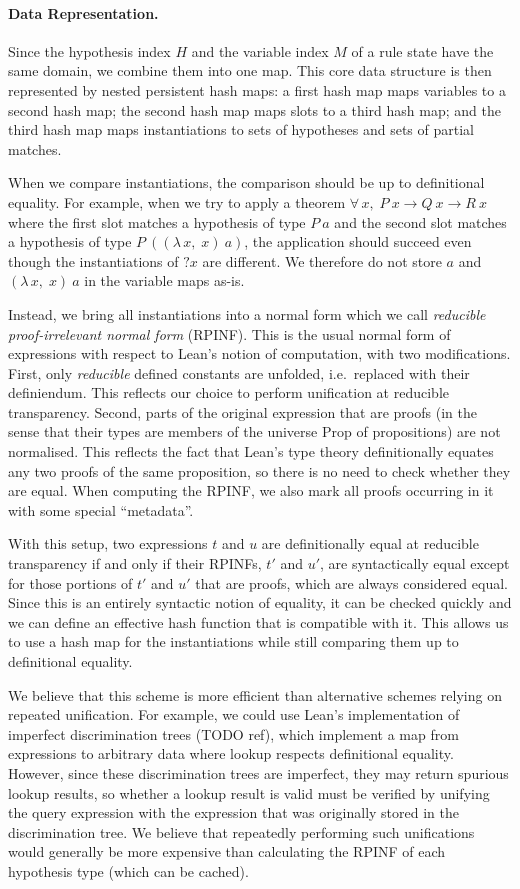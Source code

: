 \documentclass[runningheads]{llncs}
\newcommand{\Lam}[2]{\ensuremath{\lambda\, #1,\; #2}}
\newcommand{\All}[2]{\ensuremath{\forall\, #1,\; #2}}
\newcommand{\mvar}[1]{\ensuremath{?#1}}
\newcommand{\Prop}{\ensuremath{\mathrm{Prop}}}
\begin{document}
\paragraph{Data Representation.}
Since the hypothesis index $H$ and the variable index $M$ of a rule state have the same domain, we combine them into one map.
This core data structure is then represented by nested persistent hash maps: a first hash map maps variables to a second hash map; the second hash map maps slots to a third hash map; and the third hash map maps instantiations to sets of hypotheses and sets of partial matches.

When we compare instantiations, the comparison should be up to definitional equality.
For example, when we try to apply a theorem $\All{x}{P~x → Q~x → R~x}$ where the first slot matches a hypothesis of type $P~a$ and the second slot matches a hypothesis of type $P~((\Lam{x}{x})~a)$, the application should succeed even though the instantiations of $\mvar{x}$ are different.
We therefore do not store $a$ and $(\Lam{x}{x})~a$ in the variable maps as-is.

Instead, we bring all instantiations into a normal form which we call \emph{reducible proof-irrelevant normal form} (RPINF).
This is the usual normal form of expressions with respect to Lean's notion of computation, with two modifications.
First, only \emph{reducible} defined constants are unfolded, i.e.\ replaced with their definiendum.
This reflects our choice to perform unification at reducible transparency.
Second, parts of the original expression that are proofs (in the sense that their types are members of the universe $\Prop$ of propositions) are not normalised.
This reflects the fact that Lean's type theory definitionally equates any two proofs of the same proposition, so there is no need to check whether they are equal.
When computing the RPINF, we also mark all proofs occurring in it with some special \enquote{metadata}.

With this setup, two expressions $t$ and $u$ are definitionally equal at reducible transparency if and only if their RPINFs, $t'$ and $u'$, are syntactically equal except for those portions of $t'$ and $u'$ that are proofs, which are always considered equal.
Since this is an entirely syntactic notion of equality, it can be checked quickly and we can define an effective hash function that is compatible with it.
This allows us to use a hash map for the instantiations while still comparing them up to definitional equality.

We believe that this scheme is more efficient than alternative schemes relying on repeated unification.
For example, we could use Lean's implementation of imperfect discrimination trees (TODO ref), which implement a map from expressions to arbitrary data where lookup respects definitional equality.
However, since these discrimination trees are imperfect, they may return spurious lookup results, so whether a lookup result is valid must be verified by unifying the query expression with the expression that was originally stored in the discrimination tree.
We believe that repeatedly performing such unifications would generally be more expensive than calculating the RPINF of each hypothesis type (which can be cached).
\end{document}
